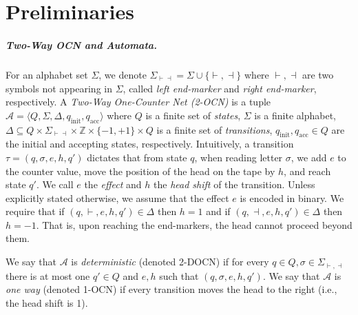 \documentclass[USenglish]{lipics-v2021}
\newcommand{\tup}[1]{\langle #1 \rangle}
\newcommand{\lmark}{\vdash}
\newcommand{\rmark}{\dashv}
\newcommand{\initstate}{q_{\mathrm{init}}}
\newcommand{\accstate}{q_{\mathrm{acc}}}
\newcommand{\bbZ}{\mathbb{Z}}
\newcommand{\cA}{\mathcal{A}}
\begin{document}
	\section{Preliminaries}
	\label{sec:prelim}
	\subparagraph*{Two-Way OCN and Automata.} For an alphabet set $\Sigma$, we denote
	$\Sigma_{\lmark\rmark}=\Sigma\cup \{\lmark,\rmark\}$ where $\lmark,\rmark$ are two symbols
	not appearing in $\Sigma$, called \emph{left end-marker} and \emph{right end-marker},
	respectively.  A \emph{Two-Way One-Counter Net (2-OCN)} is a tuple
	$\cA=\tup{Q,\Sigma,\Delta,\initstate,\accstate}$ where $Q$ is a finite set
	of \emph{states}, $\Sigma$ is a finite alphabet, $\Delta\subseteq
	Q\times \Sigma_{\lmark\rmark}\times \bbZ\times \{-1,+1\}\times Q$ is a finite set of \emph{transitions}, $\initstate,\accstate\in Q$ are the initial and accepting states, respectively. 
	Intuitively, a transition $\tau=(q,\sigma,e,h,q')$ dictates that from state $q$, when reading letter $\sigma$, we add $e$ to the counter value, move the position of the head on the tape by $h$, and reach state $q'$. We call $e$ 
	the \emph{effect} and  $h$ the \emph{head shift} of the transition. Unless explicitly stated otherwise, we assume that the effect $e$ is encoded in binary.
	We require that if $(q,\lmark,e,h,q')\in \Delta$ then $h=1$ and if
	$(q,\rmark,e,h,q')\in \Delta$ then $h=-1$. That is, upon reaching the end-markers, the head cannot proceed beyond them.
	
	We say that $\cA$ is \emph{deterministic} (denoted 2-DOCN) if for every $q\in
	Q,\sigma\in \Sigma_{\lmark,\rmark}$ there is at most one $q'\in Q$ and $e,h$ such that
	$(q,\sigma,e,h,q')$. We say that $\cA$ is \emph{one way} (denoted 1-OCN) if every
	transition moves the head to the right (i.e., the head shift is 1).
	
\end{document}
